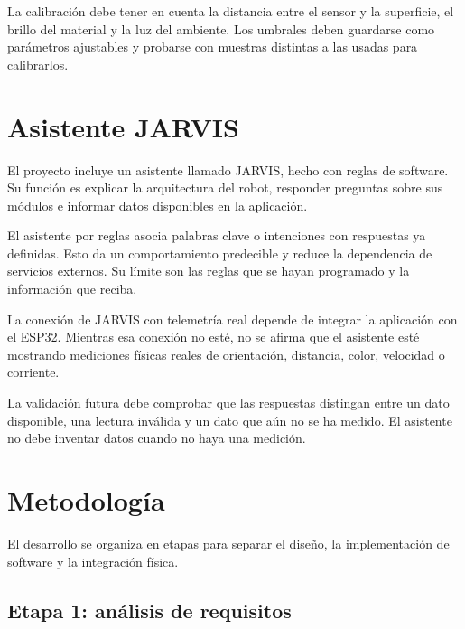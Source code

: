 \documentclass[journal]{IEEEtran}
\begin{document}
La calibración debe tener en cuenta la distancia entre el sensor y la superficie, el brillo del material y la luz del ambiente. Los umbrales deben guardarse como parámetros ajustables y probarse con muestras distintas a las usadas para calibrarlos.


\section{Asistente JARVIS}

El proyecto incluye un asistente llamado JARVIS, hecho con reglas de software. Su función es explicar la arquitectura del robot, responder preguntas sobre sus módulos e informar datos disponibles en la aplicación.

El asistente por reglas asocia palabras clave o intenciones con respuestas ya definidas. Esto da un comportamiento predecible y reduce la dependencia de servicios externos. Su límite son las reglas que se hayan programado y la información que reciba.

La conexión de JARVIS con telemetría real depende de integrar la aplicación con el ESP32. Mientras esa conexión no esté, no se afirma que el asistente esté mostrando mediciones físicas reales de orientación, distancia, color, velocidad o corriente.

La validación futura debe comprobar que las respuestas distingan entre un dato disponible, una lectura inválida y un dato que aún no se ha medido. El asistente no debe inventar datos cuando no haya una medición.


\section{Metodología}

El desarrollo se organiza en etapas para separar el diseño, la implementación de software y la integración física.

\subsection{Etapa 1: análisis de requisitos}
\end{document}
